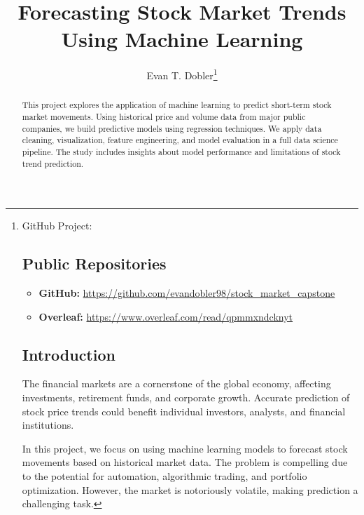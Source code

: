\documentclass[runningheads]{llncs}
\begin{document}
\title{Forecasting Stock Market Trends Using Machine Learning}

\author{Evan T. Dobler\thanks{GitHub Project: \section*{Public Repositories}
\begin{itemize}
    \item \textbf{GitHub:} \url{https://github.com/evandobler98/stock_market_capstone}
    \item \textbf{Overleaf:} \url{https://www.overleaf.com/read/qpmmxndcknyt}
\end{itemize}




\maketitle

\begin{abstract}
This project explores the application of machine learning to predict short-term stock market movements. Using historical price and volume data from major public companies, we build predictive models using regression techniques. We apply data cleaning, visualization, feature engineering, and model evaluation in a full data science pipeline. The study includes insights about model performance and limitations of stock trend prediction.
\end{abstract}

\section{Introduction}
The financial markets are a cornerstone of the global economy, affecting investments, retirement funds, and corporate growth. Accurate prediction of stock price trends could benefit individual investors, analysts, and financial institutions. 

In this project, we focus on using machine learning models to forecast stock movements based on historical market data. The problem is compelling due to the potential for automation, algorithmic trading, and portfolio optimization. However, the market is notoriously volatile, making prediction a challenging task. 

}}
\end{document}
